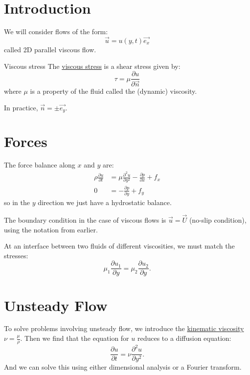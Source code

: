 \documentclass[../Main.tex]{subfiles}
\begin{document}
\section{Introduction}
We will consider flows of the form:
\begin{equation*}
    \vec{u} = u(y, t) \vec{e_x}
\end{equation*}
called 2D parallel viscous flow.

\begin{definition}{Viscous stress}
    The \underline{viscous stress} is a shear stress given by:
    \begin{equation*}
        \tau = \mu \frac{\partial u}{\partial \vec{n}}
    \end{equation*}
    where $\mu$ is a property of the fluid called the (dynamic) viscosity.
\end{definition}
In practice, $\vec{n} = \pm \vec{e_y}$.
\section{Forces}
The force balance along $x$ and $y$ are:
\begin{align*}
    \rho \frac{\partial u}{\partial t} &= \mu \frac{\partial^{2}u}{\partial y^{2}} - \frac{\partial p}{\partial x} + f_x \\
    0 &= -\frac{\partial p}{\partial y} + f_y
\end{align*}
so in the $y$ direction we just have a hydrostatic balance.

The boundary condition in the case of viscous flows is $\vec{u} = \vec{U}$ (no-slip condition), using the notation from earlier.

At an interface between two fluids of different viscosities, we must match the stresses:
\begin{equation*}
    \mu_1 \frac{\partial u_1}{\partial y} = \mu_2 \frac{\partial u_2}{\partial y}.
\end{equation*}
\section{Unsteady Flow}
To solve problems involving unsteady flow, we introduce the \underline{kinematic viscosity} $\nu = \frac{\mu}{\rho}$. Then we find that the equation for $u$ reduces to a diffusion equation:
\begin{equation*}
    \frac{\partial u}{\partial t} = \nu \frac{\partial^{2}u}{\partial y^{2}}.
\end{equation*}
And we can solve this using either dimensional analysis or a Fourier transform.
\end{document}
